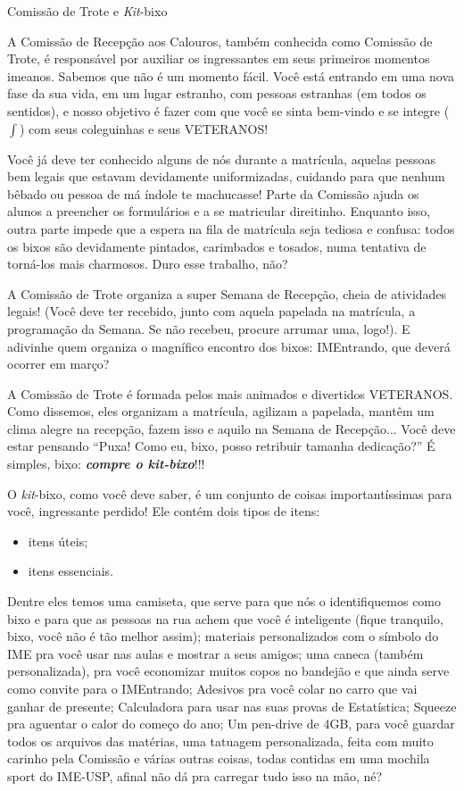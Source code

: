 \begin{secao}{Comissão de Trote e \textit{Kit}-bixo}

A Comissão de Recepção aos Calouros, também conhecida como Comissão de Trote,
é responsável por auxiliar os ingressantes em seus primeiros momentos imeanos.
Sabemos que não é um momento fácil. Você está entrando em uma nova fase da
sua vida, em um lugar estranho, com pessoas estranhas (em todos os sentidos), e
nosso objetivo é fazer com que você se sinta bem-vindo e se integre ($\int$)
com seus coleguinhas e seus VETERANOS!

Você já deve ter conhecido alguns de nós durante a matrícula, aquelas pessoas
bem legais que estavam devidamente uniformizadas, cuidando para que nenhum
bêbado ou pessoa de má índole te machucasse! Parte da Comissão ajuda os
alunos a preencher os formulários e a se matricular direitinho. Enquanto isso,
outra parte impede que a espera na fila de matrícula seja tediosa e confusa:
todos os bixos são devidamente pintados, carimbados e tosados, numa tentativa
de torná-los mais charmosos. Duro esse trabalho, não?

A Comissão de Trote organiza a super Semana de Recepção, cheia de atividades
legais! (Você deve ter recebido, junto com aquela papelada na matrícula, a
programação da Semana. Se não recebeu, procure arrumar uma, logo!).
E adivinhe quem organiza o magnífico encontro dos bixos: IMEntrando, que deverá
ocorrer em março? %

A Comissão de Trote é formada pelos mais animados e divertidos VETERANOS. Como
dissemos, eles organizam a matrícula, agilizam a papelada, mantêm um clima
alegre na recepção, fazem isso e aquilo na Semana de Recepção...
Você deve estar pensando ``Puxa! Como eu, bixo, posso retribuir
tamanha dedicação?'' É simples, bixo: {\bf\em compre o \textit{kit}-bixo}!!!

O \textit{kit}-bixo, como você deve saber, é um conjunto de coisas importantíssimas
para você, ingressante perdido! Ele contém dois tipos de itens:
\begin{itemize}
\item itens úteis;
\item itens essenciais.
\end{itemize} %
Dentre eles temos uma camiseta, que serve para que
nós o identifiquemos como bixo e para que as pessoas na rua achem que você é
inteligente (fique tranquilo, bixo, você não é tão melhor assim);
 materiais personalizados com o símbolo do IME pra você usar nas aulas e mostrar a seus amigos;
 uma caneca (também personalizada), pra você economizar muitos copos no bandejão
e que ainda serve como convite para o IMEntrando;
 Adesivos pra você colar no carro que vai ganhar de presente;
 Calculadora para usar nas suas provas de Estatística;
 Squeeze pra aguentar o calor do começo do ano;
 Um pen-drive de 4GB, para você guardar todos os arquivos das matérias,
 uma tatuagem personalizada, feita com muito carinho pela Comissão e
 várias outras coisas, todas contidas em uma mochila sport do IME-USP, afinal
 não dá pra carregar tudo isso na mão, né?


\end{secao}
